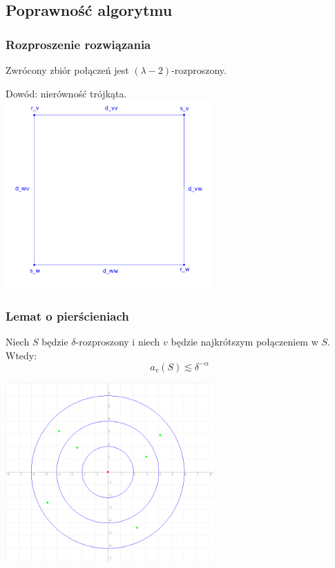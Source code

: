 \documentclass[polish, t,10pt]{beamer}
\begin{document}
\subsection{Poprawność algorytmu}
\begin{frame}
    \frametitle{Rozproszenie rozwiązania}
    \begin{lemma}
        Zwrócony zbiór połączeń jest $(\lambda - 2)$-rozproszony.
    \end{lemma}
    Dowód: nierówność trójkąta. \\
    \centering
    \includegraphics[width=0.6\textwidth]{pictures/triangle-inequality.png}
\end{frame}

\begin{frame}
    \frametitle{Lemat o pierścieniach}
    \begin{lemma}
        Niech $S$ będzie $\delta$-rozproszony i niech $v$ będzie najkrótszym połączeniem w $S$. Wtedy:
        \begin{equation*}
            a_v(S) \lesssim \delta^{-\alpha}
        \end{equation*}
    \end{lemma}
    \centering
    \includegraphics[width=0.6\textwidth]{pictures/rings.png}
\end{frame}
\end{document}
